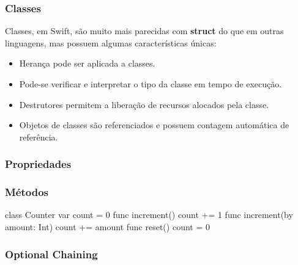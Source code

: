 \begin{frame}[fragile]
    \frametitle{Classes}

    Classes, em Swift, são muito mais parecidas com \textbf{struct} do
    que em outras linguagens, mas possuem algumas características únicas:

    \begin{itemize}
        \item Herança pode ser aplicada a classes.
        \item Pode-se verificar e interpretar o tipo da classe em tempo
        de execução.
        \item Destrutores permitem a liberação de recursos alocados pela
        classe.
        \item Objetos de classes são referenciados e possuem contagem
        automática de referência.
    \end{itemize}
\end{frame}

\begin{frame}[fragile]
    \frametitle{Propriedades}

\end{frame}

\begin{frame}[fragile]
    \frametitle{Métodos}

    \begin{swift}
        class Counter {
            var count = 0
            func increment() {
                count += 1
            }
            func increment(by amount: Int) {
                count += amount
            }
            func reset() {
                count = 0
            }
        }
    \end{swift}
\end{frame}

\begin{frame}[fragile]
    \frametitle{Optional Chaining}

\end{frame}

